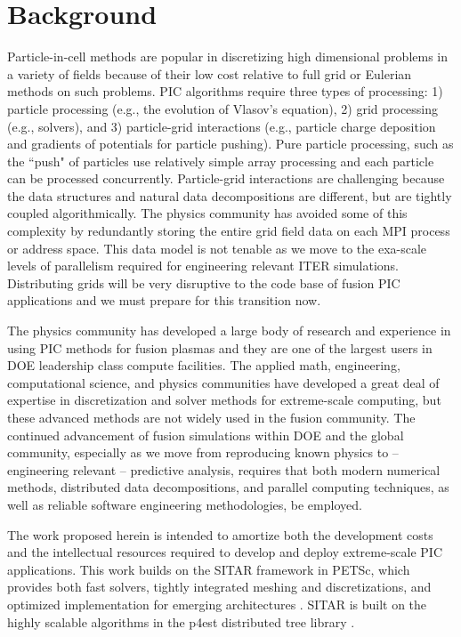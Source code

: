 \documentclass[review]{siamart}
\begin{document}
\section{Background}

Particle-in-cell methods are popular in discretizing high dimensional problems in a variety of fields because of their low cost relative to full grid or Eulerian methods on such problems.
PIC algorithms require three types of processing: 1) particle processing (e.g., the evolution of Vlasov's equation), 2) grid processing (e.g., solvers), and 3) particle-grid interactions (e.g., particle charge deposition and gradients of potentials for particle pushing).
Pure particle processing, such as the ``push" of particles use relatively simple array processing and each particle can be processed concurrently.
Particle-grid interactions are challenging because the data structures and natural data decompositions are different, but are tightly coupled algorithmically.
The physics community has avoided some of this complexity by redundantly storing the entire grid field data on each MPI process or address space.
This data model is not tenable as we move to the exa-scale levels of parallelism required for engineering relevant ITER simulations.
Distributing grids will be very disruptive to the code base of fusion PIC applications and we must prepare for this transition now.

The physics community has developed a large body of research and experience in using PIC methods for fusion plasmas and they are one of the largest users in DOE leadership class compute facilities.
The applied math, engineering, computational science, and physics communities have developed a great deal of expertise in discretization and solver methods for extreme-scale computing, but these advanced methods are not widely used in the fusion community.
The continued advancement of fusion simulations within DOE and the global community, especially as we move from reproducing known physics to -- engineering relevant -- predictive analysis, requires that both modern numerical methods, distributed data decompositions, and parallel computing techniques, as well as reliable software engineering methodologies, be employed.

The work proposed herein is intended to amortize both the development costs and the intellectual resources required to develop and deploy extreme-scale PIC applications.
This work builds on the SITAR framework in PETSc, which provides both fast solvers, tightly integrated meshing and discretizations, and optimized implementation for emerging architectures \cite{KnepleyBrownMcInnesSmithRuppAdams2015}.
SITAR is built on the highly scalable algorithms in the p4est distributed tree library \cite{DBLP:journals/siamsc/IsaacBWG15,Rudi:2015:EIS:2807591.2807675,Stadler1033}.
\end{document}
